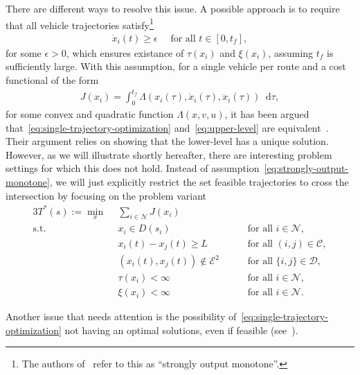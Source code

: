 \documentclass[a4paper]{report}
\theoremstyle{definition}
\theoremstyle{plain}
\newcommand*\diff{\mathop{}\!\mathrm{d}}
\begin{document}
There are different ways to resolve this issue. A possible approach is to
require that all vehicle trajectories satisfy\footnote{The authors
  of~\cite{hultApproximateSolutionOptimal2015} refer to this as ``strongly
  output monotone''.}
\begin{align}\label{eq:strongly-output-monotone}
  \dot{x}_{i}(t) \geq \epsilon \quad \text{ for all } t \in [0, t_{f}] ,
\end{align}
for some $\epsilon > 0$, which ensures
existance of $\tau(x_{i})$ and $\xi(x_{i})$, assuming $t_{f}$ is sufficiently large.
%
With this assumption, for a single vehicle per route and a cost functional of
the form
\begin{align}
  J(x_{i}) = \int_{0}^{t_{f}} \Lambda(x_{i}(\tau), \dot{x}_{i}(\tau), \ddot{x}_{i}(\tau)) \diff \tau ,
\end{align}
for some convex and quadratic function $\Lambda(x,v,u)$, it has been argued that~\eqref{eq:single-trajectory-optimization}
and~\eqref{eq:upper-level} are equivalent~\cite[Theorem 1]{hultTechnicalReportApproximate}.
%
Their argument relies on showing that the lower-level has a unique solution.
However, as we will illustrate shortly hereafter, there are interesting problem
settings for which this does not hold.
%
Instead of assumption~\eqref{eq:strongly-output-monotone}, we will just
explicitly restrict the set feasible trajectories to cross the intersection by
focusing on the problem variant
\begin{alignat}{3}\label{eq:single-trajectory-optimization-variant}
  T^{*}(s) := \min_{x} \;\, & \sum_{i \in \mathcal{N}} J(x_{i}) \tag{T*} \\
  \text{s.t. } \; & x_{i} \in D(s_{i}) && \quad \text{ for all } i \in \mathcal{N} , \nonumber \\
           & x_{i}(t) - x_{j}(t) \geq L && \quad \text{ for all } (i,j) \in \mathcal{C} , \nonumber \\
           & (x_{i}(t), x_{j}(t)) \notin \mathcal{E}^{2} && \quad\text{ for all } \{i, j\} \in \mathcal{D} , \nonumber \\
           & \tau(x_{i}) < \infty && \quad \text{ for all } i \in \mathcal{N} , \tag{T*.4} \label{eq:T4*} \\
           & \xi(x_{i}) < \infty && \quad  \text{ for all } i \in \mathcal{N} . \tag{T*.5} \label{eq:T5*}
\end{alignat}

Another issue that needs attention is the possibility
of~\eqref{eq:single-trajectory-optimization} not having an optimal solutions,
even if feasible (see~\cite[Section 4.5]{liberzonCalculusVariationsOptimal}).
\end{document}
